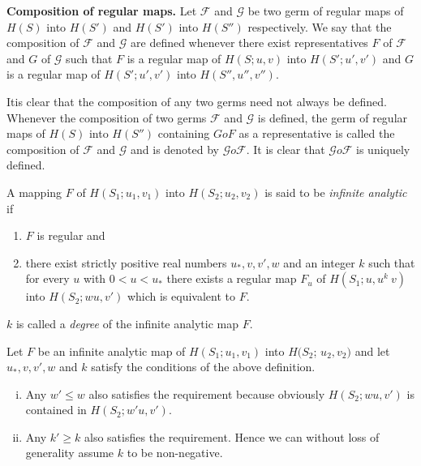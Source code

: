\noindent 
\textbf{Composition of regular maps.} Let $\mathscr{F}$ and
$\mathscr{G}$ be two germ of regular maps of $H(S)$ into $H(S')$ and
$H(S')$ into $H(S'')$ respectively. We say that the composition of
$\mathscr{F}$ and $\mathscr{G}$ are defined whenever there exist
representatives $F$ of $\mathscr{F}$ and $G$ of $\mathscr{G}$ such
that $F$ is a regular map of $H(S; u,  v)$ into $H(S'; u',  v')$ and
$G$ is a regular map of $H(S'; u',  v')$ into $H(S'', u'',  v'')$. 

It\pageoriginale is clear that the composition of any two germs need not always be
defined. Whenever the composition of  two germs $\mathscr{F}$ and
$\mathscr{G}$ is defined,  the germ of regular maps of $H(S)$ into
$H(S'')$ containing $GoF$ as a representative is called the composition
of $\mathscr{F}$ and $\mathscr{G}$ and is denoted by $\mathscr{G} o
\mathscr{F}$. It is clear that $\mathscr{G} o \mathscr{F}$ is uniquely
defined. 

\begin{defi*}%
  A mapping $F$ of $H(S_1; u_1, v_1)$ into $H(S_2; u_2,  v_2)$ is said
  to be {\em{infinite analytic }} if  
  \begin{enumerate}[\rm (i)]
  \item $F$ is regular and 
  \item there exist strictly positive real numbers $u_*,   v,   v',
    w$ and an integer $k$ such that for every $u$ with $0 < u < u_*$ there
    exists a regular map $F_u$ of $H(S_1; u,  u^k ~v)$ into $H(S_2;
    wu,  v')$ which is equivalent to $F$. 
  \end{enumerate}
\end{defi*}

$k$ is called a \textit{degree} of the infinite analytic map $F$.

\begin{remarks*}%
  Let $F$ be an infinite analytic map of $H(S_1; u_1,  v_1)$ into
  $H(S_2$; $u_2,  v_2)$ and let $u_*,  v,  v',  w$ and $k$ satisfy the
  conditions of the above definition. 
  \begin{enumerate}[(i)]
  \item Any $w' \le w$ also satisfies the requirement because obviously
    \break 
    $H(S_2; wu,  v')$ is contained in $H(S_2; w'u,  v')$. 
  \item Any $k' \ge k$ also satisfies the requirement. Hence we can
    without loss of generality assume $k$ to be non-negative. 
  \end{enumerate}
\end{remarks*}

